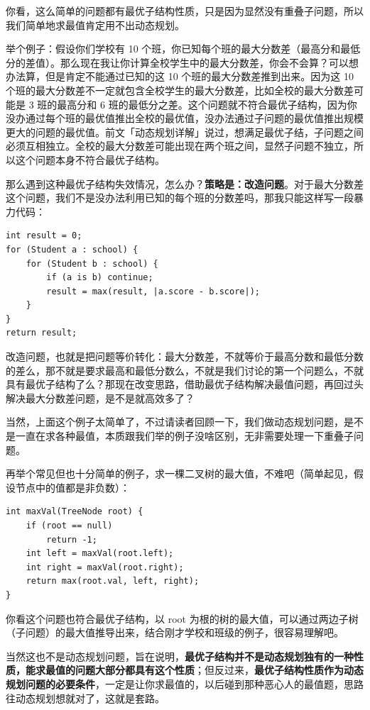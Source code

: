 \documentclass[12pt]{article}
\begin{document}
你看，这么简单的问题都有最优子结构性质，只是因为显然没有重叠子问题，所以我们简单地求最值肯定用不出动态规划。

举个例子：假设你们学校有 10 个班，你已知每个班的最大分数差（最高分和最低分的差值）。那么现在我让你计算全校学生中的最大分数差，你会不会算？可以想办法算，但是肯定不能通过已知的这 10 个班的最大分数差推到出来。因为这 10 个班的最大分数差不一定就包含全校学生的最大分数差，比如全校的最大分数差可能是 3 班的最高分和 6 班的最低分之差。这个问题就不符合最优子结构，因为你没办通过每个班的最优值推出全校的最优值，没办法通过子问题的最优值推出规模更大的问题的最优值。前文「动态规划详解」说过，想满足最优子结，子问题之间必须互相独立。全校的最大分数差可能出现在两个班之间，显然子问题不独立，所以这个问题本身不符合最优子结构。

那么遇到这种最优子结构失效情况，怎么办？\textbf{策略是：改造问题}。对于最大分数差这个问题，我们不是没办法利用已知的每个班的分数差吗，那我只能这样写一段暴力代码：
\begin{lstlisting}
int result = 0;
for (Student a : school) {
    for (Student b : school) {
        if (a is b) continue;
        result = max(result, |a.score - b.score|);
    }
}
return result;
\end{lstlisting}
改造问题，也就是把问题等价转化：最大分数差，不就等价于最高分数和最低分数的差么，那不就是要求最高和最低分数么，不就是我们讨论的第一个问题么，不就具有最优子结构了么？那现在改变思路，借助最优子结构解决最值问题，再回过头解决最大分数差问题，是不是就高效多了？

当然，上面这个例子太简单了，不过请读者回顾一下，我们做动态规划问题，是不是一直在求各种最值，本质跟我们举的例子没啥区别，无非需要处理一下重叠子问题。

再举个常见但也十分简单的例子，求一棵二叉树的最大值，不难吧（简单起见，假设节点中的值都是非负数）：
\begin{lstlisting}
int maxVal(TreeNode root) {
    if (root == null)
        return -1;
    int left = maxVal(root.left);
    int right = maxVal(root.right);
    return max(root.val, left, right);
}
\end{lstlisting}
你看这个问题也符合最优子结构，以 root 为根的树的最大值，可以通过两边子树（子问题）的最大值推导出来，结合刚才学校和班级的例子，很容易理解吧。

当然这也不是动态规划问题，旨在说明，\textbf{最优子结构并不是动态规划独有的一种性质，能求最值的问题大部分都具有这个性质}；但反过来，\textbf{最优子结构性质作为动态规划问题的必要条件}，一定是让你求最值的，以后碰到那种恶心人的最值题，思路往动态规划想就对了，这就是套路。
\end{document}

